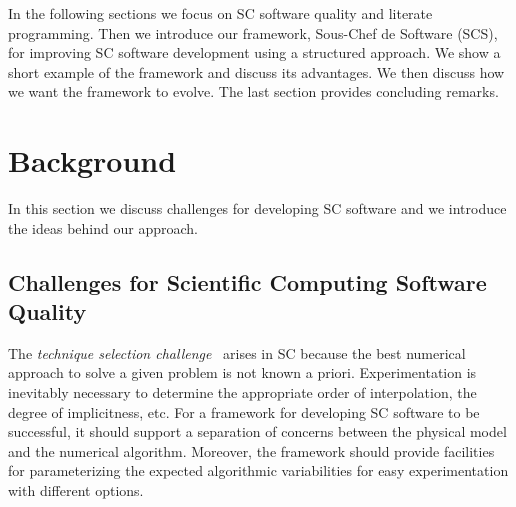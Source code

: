 \documentclass{sig-alternate-05-2015}
\newcommand{\lss}{SCS}
\newcommand{\fullname}{Sous-Chef de Software}
\begin{document}
In the following sections we  
focus on SC software quality and literate
programming.
Then we introduce our framework, \fullname{} (\lss{}), 
for improving SC software development using a structured approach.  We show
a short example of the framework and discuss its advantages. 
We then discuss how we want the framework to evolve. %
The last section provides concluding remarks.

\section{Background} \label{sec:background}

In this section we discuss challenges for developing SC software and we
introduce the ideas behind our approach.

\subsection{Challenges for Scientific Computing Software
  Quality} \label{ssec:challenges}


The \textit{technique selection challenge}~\cite{Yu2011} arises in SC because
the best numerical approach to solve a given problem is not known a priori.
Experimentation is inevitably necessary to determine the
appropriate order of interpolation, the degree of implicitness, etc. For a
framework for developing SC software to be successful, it should support
a separation of concerns between the physical model and the numerical algorithm.
Moreover, the framework should provide facilities for parameterizing the
expected algorithmic variabilities for easy experimentation with different
options.
\end{document}
